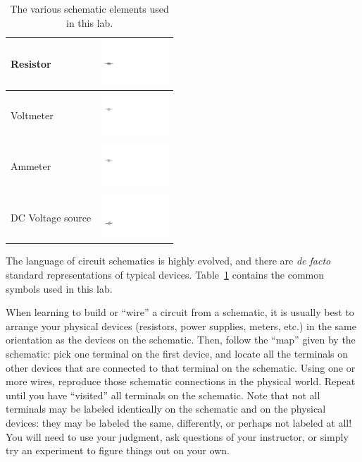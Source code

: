 \documentclass[12pt]{article}
\begin{document}
\begin{table}
  \centering
  \begin{tabular}{|l|c|}\hline
    Resistor & \includegraphics[width=1in]{figures/resistor}\\ \hline
    Voltmeter & \includegraphics[width=1in]{figures/voltmeter}\\ \hline
    Ammeter & \includegraphics[width=1in]{figures/ammeter} \\ \hline
    DC Voltage source & \includegraphics[width=1in]{figures/dc_supply}\\ \hline
  \end{tabular}
  \caption{The various schematic elements used in this lab.}
  \label{tab:schematic}
\end{table}
The language of circuit schematics is highly evolved, and there are
\textit{de facto} standard representations of typical devices.
Table~\ref{tab:schematic} contains the common symbols used in this
lab.

When learning to build or ``wire'' a circuit from a schematic, it is
usually best to arrange your physical devices (resistors, power
supplies, meters, etc.) in the same orientation as the devices on the
schematic.  Then, follow the ``map'' given by the schematic: pick one
terminal on the first device, and locate all the terminals on other
devices that are connected to that terminal on the schematic.  Using
one or more wires, reproduce those schematic connections in the
physical world.  Repeat until you have ``visited'' all terminals on
the schematic.  Note that not all terminals may be labeled identically
on the schematic and on the physical devices: they may be labeled the
same, differently, or perhaps not labeled at all!  You will need to
use your judgment, ask questions of your instructor, or simply try an
experiment to figure things out on your own.
\end{document}
